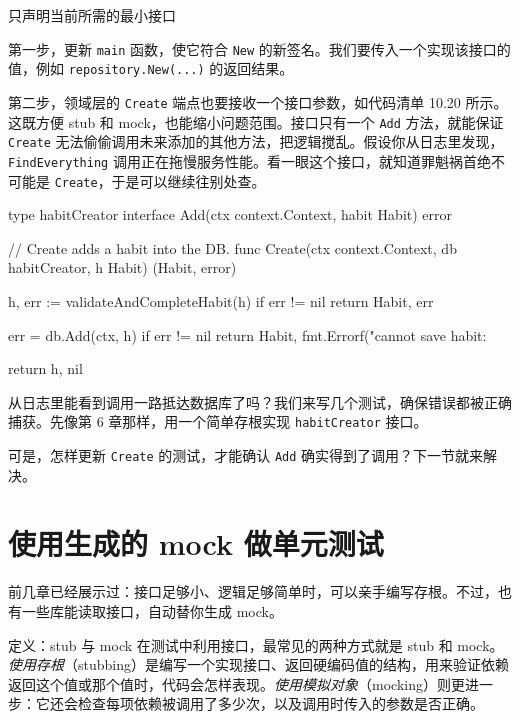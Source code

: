 \begin{codeannotations}
\item 只声明当前所需的最小接口
\end{codeannotations}

第一步，更新 \texttt{main} 函数，使它符合 \texttt{New} 的新签名。我们要传入一个实现该接口的值，例如 \texttt{repository.New(...)} 的返回结果。

第二步，领域层的 \texttt{Create} 端点也要接收一个接口参数，如代码清单 10.20 所示。这既方便 stub 和 mock，也能缩小问题范围。接口只有一个 \texttt{Add} 方法，就能保证 \texttt{Create} 无法偷偷调用未来添加的其他方法，把逻辑搅乱。假设你从日志里发现，\texttt{FindEverything} 调用正在拖慢服务性能。看一眼这个接口，就知道罪魁祸首绝不可能是 \texttt{Create}，于是可以继续往别处查。

\begin{gocode}[title={代码清单 10.20 \texttt{create.go}：在逻辑函数中调用仓库}]
type habitCreator interface {
    Add(ctx context.Context, habit Habit) error
}

// Create adds a habit into the DB.
func Create(ctx context.Context, db habitCreator, h Habit) (Habit, error) {
    h, err := validateAndCompleteHabit(h)
    if err != nil {
        return Habit{}, err
    }

    err = db.Add(ctx, h)
    if err != nil {
        return Habit{}, fmt.Errorf("cannot save habit: %
    }

    return h, nil
}
\end{gocode}

从日志里能看到调用一路抵达数据库了吗？我们来写几个测试，确保错误都被正确捕获。先像第 6 章那样，用一个简单存根实现 \texttt{habitCreator} 接口。

可是，怎样更新 \texttt{Create} 的测试，才能确认 \texttt{Add} 确实得到了调用？下一节就来解决。

\section{使用生成的 mock 做单元测试}

前几章已经展示过：接口足够小、逻辑足够简单时，可以亲手编写存根。不过，也有一些库能读取接口，自动替你生成 mock。

\begin{infobox}{定义：stub 与 mock}
在测试中利用接口，最常见的两种方式就是 stub 和 mock。\emph{使用存根}（stubbing）是编写一个实现接口、返回硬编码值的结构，用来验证依赖返回这个值或那个值时，代码会怎样表现。\emph{使用模拟对象}（mocking）则更进一步：它还会检查每项依赖被调用了多少次，以及调用时传入的参数是否正确。
\end{infobox}

